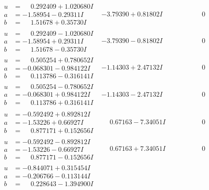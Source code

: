 \documentclass[1p]{elsarticle_modified}
\theoremstyle{definition}
\begin{document}
$$\begin{array}{c|c|c}
\begin{aligned}
u &= \phantom{-}0.292409 + 1.020680 I \\
a &= -1.58954 - 0.29311 I \\
b &= \phantom{-}1.51678 + 0.35730 I\end{aligned}
 & -3.79390 + 0.81802 I & \phantom{-0.000000 } 0 \\ \hline\begin{aligned}
u &= \phantom{-}0.292409 - 1.020680 I \\
a &= -1.58954 + 0.29311 I \\
b &= \phantom{-}1.51678 - 0.35730 I\end{aligned}
 & -3.79390 - 0.81802 I & \phantom{-0.000000 } 0 \\ \hline\begin{aligned}
u &= \phantom{-}0.505254 + 0.780652 I \\
a &= -0.068301 - 0.984122 I \\
b &= \phantom{-}0.113786 - 0.316141 I\end{aligned}
 & -1.14303 + 2.47132 I & \phantom{-0.000000 } 0 \\ \hline\begin{aligned}
u &= \phantom{-}0.505254 - 0.780652 I \\
a &= -0.068301 + 0.984122 I \\
b &= \phantom{-}0.113786 + 0.316141 I\end{aligned}
 & -1.14303 - 2.47132 I & \phantom{-0.000000 } 0 \\ \hline\begin{aligned}
u &= -0.592492 + 0.892812 I \\
a &= -1.53226 + 0.66927 I \\
b &= \phantom{-}0.877171 + 0.152656 I\end{aligned}
 & \phantom{-}0.67163 - 7.34051 I & \phantom{-0.000000 } 0 \\ \hline\begin{aligned}
u &= -0.592492 - 0.892812 I \\
a &= -1.53226 - 0.66927 I \\
b &= \phantom{-}0.877171 - 0.152656 I\end{aligned}
 & \phantom{-}0.67163 + 7.34051 I & \phantom{-0.000000 } 0 \\ \hline\begin{aligned}
u &= -0.844071 + 0.315454 I \\
a &= -0.206766 - 0.113144 I \\
b &= \phantom{-}0.228643 - 1.394900 I\end{aligned}

\end{array}$$
\end{document}
